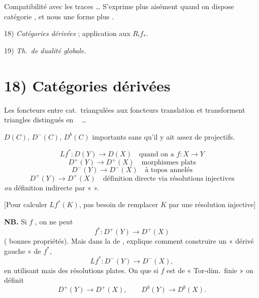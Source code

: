 \documentclass[11pt,a4paper]{article}
\begin{document}
Compatibilité avec les  traces … S'exprime plus aisément quand on dispose 
catégorie , et  nous \ill{}  une forme plus .

18) \emph{Catégories dérivées} ; application aux $R_{!} f_{*}$.

19) \emph{Th.\ de dualité globale}.


\section{18) Catégories dérivées}

Les foncteurs entre cat.\ triangulées \struck{\ill{}}  aux foncteurs translation et transforment
triangles distingués en \ \ill{}  …

$D(C)$, $D^-(C)$, $D^b(C)$ importants \ill{} sans qu'il y ait assez de projectifs.

\[
  Lf^* : D(Y) \longrightarrow D(X) \quad\text{quand on a } f : X \to Y
\]
\[
  D^+(Y) \to D^+(X) \quad \text{morphismes plats}
\]
\[
  D^-(Y) \to D^-(X) \quad \text{à topos annelés}
\]
\[
  D^+(Y) \to D^+(X) \quad \text{définition directe via résolutions injectives}
\]
\emph{ou} définition indirecte par «  ».

[Pour calculer $Lf^*(K)$, pas besoin de remplacer $K$ par une résolution injective]

\textbf{NB.} Si $f$ , \ill{} on ne peut \ill{}
\[
  f^* : D^+(Y) \to D^+(X)
\]
(\ill{} \ill{} \ill{} \ill{} \ill{} bonnes propriétés). Mais dans la  de , \ill{} explique
comment construire un « dérivé gauche » de $f^*$,
\[
  Lf^* : D^-(Y) \to D^-(X),
\]
en utilisant \ill{} \ill{} \ill{}  mais des résolutions plates. On \ill{} que si $f$ est
de « Tor-dim.\ finie » on définit
\[
  D^+(Y) \to D^+(X), \qquad D^b(Y) \to D^b(X) .
\]
\end{document}
